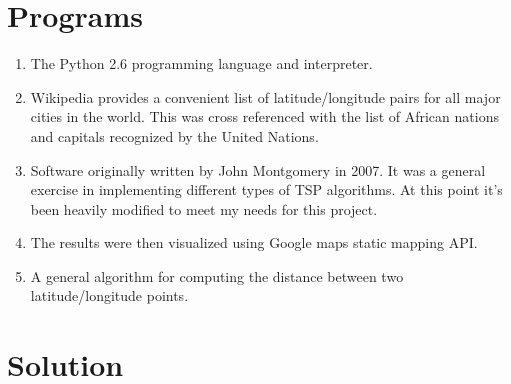 \documentclass[12pt]{article}
\begin{document}
\section{Programs}

\begin{enumerate}
\item The Python 2.6 \cite{python} programming language and interpreter.
\item Wikipedia provides a convenient list of latitude/longitude pairs for all major cities in the world. This was cross referenced with
the list of African nations and capitals recognized by the United Nations.\cite{wiki}
\item Software originally written by John Montgomery \cite{tsp} in 2007. It was a general exercise in implementing different types of TSP algorithms. At this point it's been heavily modified to meet my needs for this project.
\item The results were then visualized using Google maps static mapping API. \cite{google}
\item A general algorithm for computing the distance between two latitude/longitude points.\cite{dis}
\end{enumerate}


\section{Solution}

\end{document}
